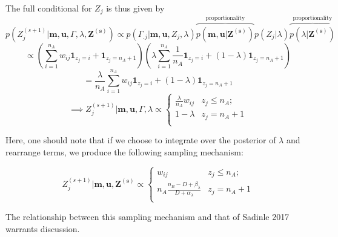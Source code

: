\documentclass[
  12pt,
]{article}
\begin{document}
The full conditional for \(Z_j\) is thus given by
\[p(Z_j^{(s+1)}|\mathbf{m}, \mathbf{u}, \Gamma, \lambda, \mathbf{Z^{(s)}}) \propto p(\Gamma_{.j}|\mathbf{m}, \mathbf{u}, Z_j, \lambda)\overbrace{p(\mathbf{m}, \mathbf{u}|\mathbf{Z^{(s)}})}^{\text{proportionality}}p(Z_j | \lambda) \overbrace{p(\lambda|\mathbf{Z^{(s)}})}^{\text{proportionality}}\]
\[\propto \left(\sum_{i=1}^{n_A}w_{ij}\mathbf{1}_{z_j = i} + \mathbf{1}_{z_j = n_A + 1}\right)\left(\lambda\sum_{i=1}^{n_A}\frac{1}{n_A}\mathbf{1}_{z_j = i} + (1-\lambda)\mathbf{1}_{z_j = n_A + 1}\right)\]
\[= \frac{\lambda}{n_A}\sum_{i=1}^{n_A}w_{ij}\mathbf{1}_{z_j = i} + (1-\lambda)\mathbf{1}_{z_j = n_A + 1} \]
\[ \implies Z_j^{(s+1)} | \mathbf{m}, \mathbf{u}, \Gamma, \lambda \propto
\begin{cases} 
    \frac{\lambda}{n_A}w_{ij}   & z_j \leq n_A; \\
     1-\lambda &  z_j  = n_A + 1 \\
\end{cases}\]

Here, one should note that if we choose to integrate over the posterior
of \(\lambda\) and rearrange terms, we produce the following sampling
mechanism:

\[Z_j^{(s+1)} | \mathbf{m}, \mathbf{u}, \mathbf{Z^{(s)}} \propto
\begin{cases} 
    w_{ij}  & z_j \leq n_A; \\
     n_A \frac{n_B - D + \beta_{\lambda}}{D + \alpha_{\lambda}} &  z_j  = n_A + 1 \\
\end{cases}\]

The relationship between this sampling mechanism and that of Sadinle
2017 warrants discussion.
\end{document}
